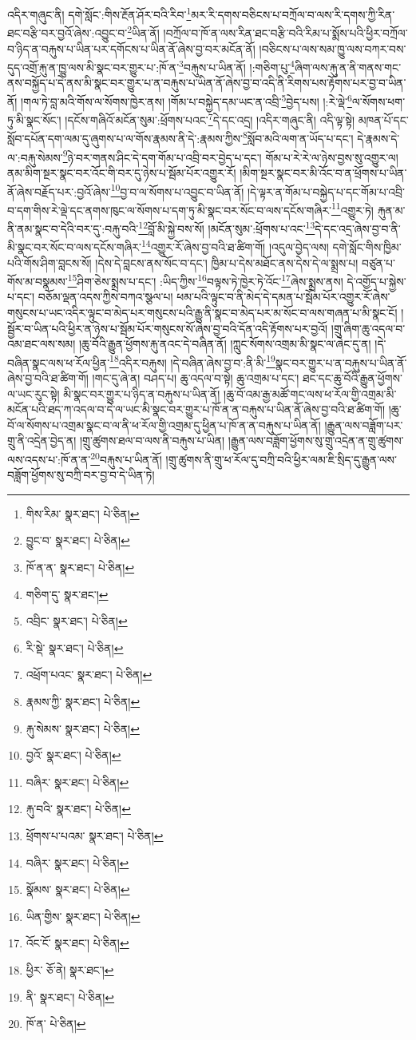 འདིར་གཞུང་ནི། དགེ་སློང་:གིས་རྔོན་ཤོར་བའི་རིབ་\footnote{གིས་རིམ་  སྣར་ཐང་།  པེ་ཅིན། }མར་རི་དགས་བཅིངས་པ་བཀྲོལ་བ་ལས་རི་དགས་ཀྱི་རིན་ཐང་བརྩི་བར་བྱའོ་ཞེས་:འབྱུང་བ་\footnote{བྱུང་བ་  སྣར་ཐང་།  པེ་ཅིན། }ཡིན་ནོ། །བཀྲོལ་བ་ཁོ་ན་ལས་རིན་ཐང་བརྩི་བའི་རིམ་པ་སྨོས་པའི་ཕྱིར་བཀྲོལ་བ་ཉིད་ན་བརྐུས་པ་ཡིན་པར་དགོངས་པ་ཡིན་ནོ་ཞེས་བྱ་བར་མངོན་ནོ། །བཅིངས་པ་ལས་སམ་ཁྱུ་ལས་བཀར་བས་དུད་འགྲོ་རྐུ་ན་ཁྱུ་ལས་མི་སྣང་བར་གྱུར་པ་:ཁོ་ན་\footnote{ཁོ་ན་ན་  སྣར་ཐང་།  པེ་ཅིན། }བརྐུས་པ་ཡིན་ནོ། །:གཅིག་པུ་\footnote{གཅིག་དུ་  སྣར་ཐང་། }ཞིག་ལས་རྐུ་ན་ནི་གནས་གང་ནས་བསྐྱོད་པ་དེ་ནས་མི་སྣང་བར་གྱུར་པ་ན་བརྐུས་པ་ཡིན་ནོ་ཞེས་བྱ་བ་འདི་ནི་རིགས་པས་རྟོགས་པར་བྱ་བ་ཡིན་ནོ། །གལ་ཏེ་བླ་མའི་གོས་ལ་སོགས་ཁྱེར་ནས། །གོམ་པ་བསྐྱེད་དམ་ཡང་ན་འབྲི་\footnote{འབྲིང་  སྣར་ཐང་།  པེ་ཅིན། }བྱེད་པས། །:རེ་ལྡེ་\footnote{རི་སྡེ་  སྣར་ཐང་།  པེ་ཅིན། }ལ་སོགས་ཕག་ཏུ་མི་སྣང་སོང་། །དངོས་གཞིའོ་མངོན་སུམ་:ཕྲོགས་པའང་\footnote{འཕྲོག་པའང་  སྣར་ཐང་།  པེ་ཅིན། }དེ་དང་འདྲ། །འདིར་གཞུང་ནི། འདི་ལྟ་སྟེ། མཁན་པོ་དང་སློབ་དཔོན་དག་ལམ་དུ་ཞུགས་པ་ལ་གོས་རྣམས་ནི་དེ་:རྣམས་ཀྱིས་\footnote{རྣམས་ཀྱི་  སྣར་ཐང་།  པེ་ཅིན། }སློབ་མའི་ལག་ན་ཡོད་པ་དང་། དེ་རྣམས་དེ་ལ་:བརྐུ་སེམས་\footnote{རྐུ་སེམས་  སྣར་ཐང་།  པེ་ཅིན། }ཉེ་བར་གནས་ཤིང་དེ་དག་གོམ་པ་འབྲི་བར་བྱེད་པ་དང་། གོམ་པ་རེ་རེ་ལ་ཉེས་བྱས་སུ་འགྱུར་ལ། ནམ་མིག་སྔར་སྣང་བར་འོང་གི་བར་དུ་ཉེས་པ་སྦོམ་པོར་འགྱུར་རོ། །མིག་སྔར་སྣང་བར་མི་འོང་བ་ན་ཕྲོགས་པ་ཡིན་ནོ་ཞེས་བརྗོད་པར་:བྱའོ་ཞེས་\footnote{བྱའོ་  སྣར་ཐང་།  པེ་ཅིན། }བྱ་བ་ལ་སོགས་པ་འབྱུང་བ་ཡིན་ནོ། །དེ་ལྟར་ན་གོམ་པ་བསྐྱེད་པ་དང་གོམ་པ་འབྲི་བ་དག་གིས་རེ་ལྡེ་དང་ནགས་ཁུང་ལ་སོགས་པ་དག་ཏུ་མི་སྣང་བར་སོང་བ་ལས་དངོས་གཞིར་\footnote{བཞིར་  སྣར་ཐང་།  པེ་ཅིན། }འགྱུར་ཏེ། རྐུན་མ་ནི་ནམ་སྣང་བ་དེའི་བར་དུ་:བརྐུ་བའི་\footnote{རྐུ་བའི་  སྣར་ཐང་།  པེ་ཅིན། }བློ་མི་སྐྱེ་བས་སོ། །མངོན་སུམ་:ཕྲོགས་པ་འང་\footnote{ཕྲོགས་པ་པའམ་  སྣར་ཐང་།  པེ་ཅིན། }དེ་དང་འདྲ་ཞེས་བྱ་བ་ནི་མི་སྣང་བར་སོང་བ་ལས་དངོས་གཞིར་\footnote{བཞིར་  སྣར་ཐང་།  པེ་ཅིན། }འགྱུར་རོ་ཞེས་བྱ་བའི་ཐ་ཚིག་གོ། །འདུལ་བྱེད་ལས། དགེ་སློང་གིས་ཁྱིམ་པའི་གོས་ཤིག་བླངས་སོ། །དེས་དེ་བླངས་ནས་སོང་བ་དང་། ཁྱིམ་པ་དེས་མཐོང་ནས་དེས་དེ་ལ་སྨྲས་པ། བཙུན་པ་གོས་མ་བསྣམས་\footnote{སྣོམས་  སྣར་ཐང་།  པེ་ཅིན། }ཤིག་ཅེས་སྨྲས་པ་དང་། :ཡིད་ཀྱིས་\footnote{ཡིན་གྱིས་  སྣར་ཐང་།  པེ་ཅིན། }བལྟས་ཏེ་ཁྱེར་ཏེ་འོང་\footnote{འོང་ངོ་  སྣར་ཐང་།  པེ་ཅིན། }ཞེས་སྨྲས་ནས། དེ་འགྱོད་པ་སྐྱེས་པ་དང་། བཅོམ་ལྡན་འདས་ཀྱིས་བཀའ་སྩལ་པ། ཕམ་པའི་ལྟུང་བ་ནི་མེད་དེ་དམན་པ་སྦོམ་པོར་འགྱུར་རོ་ཞེས་གསུངས་པ་ཡང་འདིར་ལྟུང་བ་མེད་པར་གསུངས་པའི་རྒྱུ་ནི་སྣང་བ་མེད་པར་མ་སོང་བ་ལས་གཞན་པ་མི་སྣང་ངོ། །སྦྱོར་བ་ཡིན་པའི་ཕྱིར་ན་ཉེས་པ་སྦོམ་པོར་གསུངས་སོ་ཞེས་བྱ་བའི་དོན་འདི་རྟོགས་པར་བྱའོ། །གྲུ་ཞིག་ཆུ་འདལ་བ་འམ་ཐང་ལས་སམ། །ཆུ་བོའི་རྒྱུན་ཕྱོགས་རྐུ་ནའང་དེ་བཞིན་ནོ། །ཀླུང་སོགས་འགྲམ་མི་སྣང་ལ་ཞེང་དུ་ན། །དེ་བཞིན་སྣང་ལས་ཕ་རོལ་ཕྱིན་\footnote{ཕྱིར་  ཅོ་ནེ།  སྣར་ཐང་། }འདིར་བརྐུས། །དེ་བཞིན་ཞེས་བྱ་བ་:ནི་མི་\footnote{ནི་  སྣར་ཐང་།  པེ་ཅིན། }སྣང་བར་གྱུར་པ་ན་བརྐུས་པ་ཡིན་ནོ་ཞེས་བྱ་བའི་ཐ་ཚིག་གོ། །གང་དུ་ཞེ་ན། བཤད་པ། ཆུ་འདལ་བ་སྟེ། ཆུ་འགྲམ་པ་དང་། ཐང་དང་ཆུ་བོའི་རྒྱུན་ཕྱོགས་ལ་ཡང་རུང་སྟེ། མི་སྣང་བར་གྱུར་པ་ཉིད་ན་བརྐུས་པ་ཡིན་ནོ། །ཆུ་བོ་འམ་རྒྱ་མཚོ་གང་ལས་ཕ་རོལ་གྱི་འགྲམ་མི་མངོན་པའི་ཐད་ཀ་འདལ་བ་དེ་ལ་ཡང་མི་སྣང་བར་གྱུར་པ་ཁོ་ན་ན་བརྐུས་པ་ཡིན་ནོ་ཞེས་བྱ་བའི་ཐ་ཚིག་གོ། །ཆུ་བོ་ལ་སོགས་པ་འགྲམ་སྣང་བ་ལ་ནི་ཕ་རོལ་གྱི་འགྲམ་དུ་ཕྱིན་པ་ཁོ་ན་ན་བརྐུས་པ་ཡིན་ནོ། །རྒྱུན་ལས་བཟློག་པར་གྲུ་ནི་འདྲེན་བྱེད་ན། །གྲུ་ཚུགས་ཐལ་བ་ལས་ནི་བརྐུས་པ་ཡིན། །རྒྱུན་ལས་བཟློག་ཕྱོགས་སུ་གྲུ་འདྲེན་ན་གྲུ་ཚུགས་ལས་འདས་པ་:ཁོ་ན་ན་\footnote{ཁོ་ན་  པེ་ཅིན། }བརྐུས་པ་ཡིན་ནོ། །གྲུ་ཚུགས་ནི་གྲུ་ཕ་རོལ་དུ་བཀྲི་བའི་ཕྱིར་ལམ་ཇི་སྲིད་དུ་རྒྱུན་ལས་བཟློག་ཕྱོགས་སུ་བཀྲི་བར་བྱ་བ་དེ་ཡིན་ཏེ། 